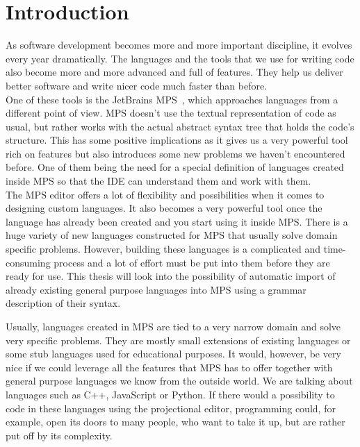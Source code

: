 \chapter{Introduction}

As software development becomes more and more important discipline, it evolves every year dramatically.
The languages and the tools that we use for writing code also become more and more advanced and full of features.
They help us deliver better software and write nicer code much faster than before.
\\

One of these tools is the JetBrains MPS~\cite{MPS}, which approaches languages from a different point of view.
MPS doesn't use the textual representation of code as usual, but rather works with the actual abstract syntax tree that holds the code's structure.
This has some positive implications as it gives us a very powerful tool rich on features but also introduces some new problems we haven't encountered before.
One of them being the need for a special definition of languages created inside MPS so that the IDE can understand them and work with them.
\\

The MPS editor offers a lot of flexibility and possibilities when it comes to designing custom languages.
It also becomes a very powerful tool once the language has already been created and you start using it inside MPS.
There is a huge variety of new languages constructed for MPS that usually solve domain specific problems.
However, building these languages is a complicated and time-consuming process and a lot of effort must be put into them before they are ready for use.
This thesis will look into the possibility of automatic import of already existing general purpose languages into MPS using a grammar description of their syntax.

Usually, languages created in MPS are tied to a very narrow domain and solve very specific problems.
They are mostly small extensions of existing languages or some stub languages used for educational purposes.
It would, however, be very nice if we could leverage all the features that MPS has to offer together with general purpose languages we know from the outside world.
We are talking about languages such as C++, JavaScript or Python.
If there would a possibility to code in these languages using the projectional editor, programming could, for example, open its doors to many people, who want to take it up, but are rather put off by its complexity.
\\


